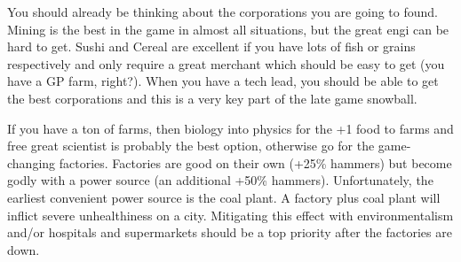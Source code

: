 \documentclass[10pt]{article}
\begin{document}
You should already be thinking about the corporations you are going to found. Mining is the best in the game in almost all
situations, but the great engi can be hard to get. Sushi and Cereal are excellent if you have lots of fish or grains respectively and only
require a great merchant which should be easy to get (you have a GP farm, right?). When you have a tech lead, you should be able
to get the best corporations and this is a very key part of the late game snowball.

If you have a ton of farms, then biology into physics for the +1 food to farms and free great scientist is probably
the best option, otherwise go for the game-changing factories. Factories are good on their own (+25\% hammers) but become
godly with a power source (an additional +50\% hammers). Unfortunately, the earliest convenient power source is the coal
plant. A factory plus coal plant will inflict severe unhealthiness on a city. Mitigating this effect with environmentalism
and/or hospitals and supermarkets should be a top priority after the factories are down.
\end{document}
